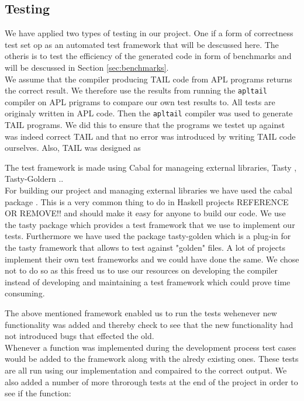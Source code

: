 \documentclass[11pt]{article}
\begin{document}
\subsection{Testing}
We have applied two types of testing in our project. One if a form of correctness test set op as an automated test
framework that will be descussed here. The otheris is to test the efficiency of the generated code in form of benchmarks and will be descussed in Section \ref{sec:benchmarks}. \\


We assume that the compiler producing TAIL code from APL programs returns the correct result. We therefore use the results from running the {\tt apltail} compiler on APL prigrams to compare our own test results to. All tests are originaly written in APL code. Then the {\tt apltail} compiler was used to generate TAIL programs. We did this to ensure that the programs we testet up against was indeed correct TAIL and that no error was introduced by writing TAIL code ourselves. Also, TAIL was designed as

The test framework is made using Cabal \cite{cabal} for manageing external libraries,  Tasty  \cite{tasty}, Tasty-Goldern \cite{tasty-golden}  .. \\

For building our project and managing external libraries we have used the cabal package \cite{cabal}. This is a very common thing to
do in Haskell projects REFERENCE OR REMOVE!! and should make it easy for anyone to build our code.
We use the tasty package \cite{tasty} which provides a test framework that we use to implement our tests. Furthermore we have used the
package tasty-golden \cite{tasty-golden} which is a plug-in for the tasty framework that allows to test against "golden" files.
A lot of projects implement their own test frameworks and we could have done the same.
We chose not to do so as this freed us to use our resources on developing the compiler instead of developing and maintaining a
test framework which could prove time consuming.

The above mentioned framework enabled us to run the tests wehenever new functionality was added and thereby check to see that the new functionality had not introduced bugs that effected the old. \\
Whenever a function was implemented during the development process test cases would be added to the framework along with the alredy existing ones. These tests are all run using our implementation and compaired to the correct output.
We also added a number of more throrough tests at the end of the project in order to see if the function:
\end{document}
